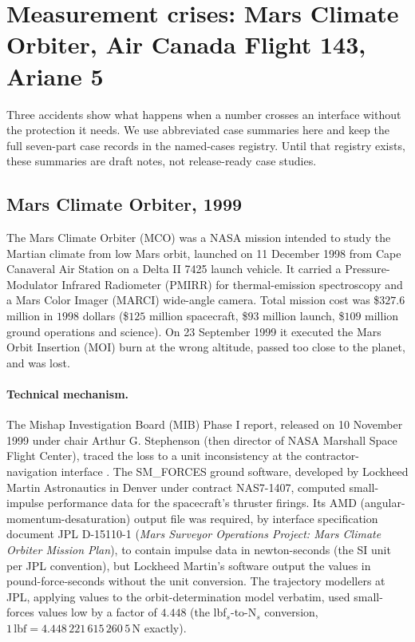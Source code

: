 \section{Measurement crises: Mars Climate Orbiter, Air Canada Flight
143, Ariane 5}

Three accidents show what happens when a number crosses an interface
without the protection it needs. We use abbreviated case summaries
here and keep the full seven-part case records in the named-cases
registry. Until that registry exists, these summaries are draft notes,
not release-ready case studies.

\subsection{Mars Climate Orbiter, 1999}

The Mars Climate Orbiter (MCO) was a NASA mission intended to
study the Martian climate from low Mars orbit, launched on
11 December 1998 from Cape Canaveral Air Station on a Delta II
7425 launch vehicle. It carried a Pressure-Modulator Infrared
Radiometer (PMIRR) for thermal-emission spectroscopy and a Mars
Color Imager (MARCI) wide-angle camera. Total mission cost was
\$$327.6$ million in $1998$ dollars (\$$125$ million spacecraft,
\$$93$ million launch, \$$109$ million ground operations and
science). On 23 September 1999 it executed the Mars Orbit
Insertion (MOI) burn at the wrong altitude, passed too close to
the planet, and was lost.

\paragraph{Technical mechanism.} The Mishap Investigation Board
(MIB) Phase I report, released on 10 November 1999 under chair
Arthur G. Stephenson (then director of NASA Marshall Space
Flight Center), traced the loss to a unit inconsistency at the
contractor-navigation interface \cite{acc:nasa-mco-mib}. The
SM\_FORCES ground software, developed by Lockheed Martin
Astronautics in Denver under contract NAS7-1407, computed
small-impulse performance data for the spacecraft's thruster
firings. Its AMD (angular-momentum-desaturation) output file was
required, by interface specification document JPL D-15110-1
(\textit{Mars Surveyor Operations Project: Mars Climate Orbiter
Mission Plan}), to contain impulse data in newton-seconds (the
SI unit per JPL convention), but Lockheed Martin's software
output the values in pound-force-seconds without the unit
conversion. The trajectory modellers at JPL, applying values to
the orbit-determination model verbatim, used small-forces values
low by a factor of $4.448$ (the lbf$_{s}$-to-N$_{s}$ conversion,
$1\,\text{lbf} = 4.448\,221\,615\,260\,5\,\si{\newton}$ exactly).

